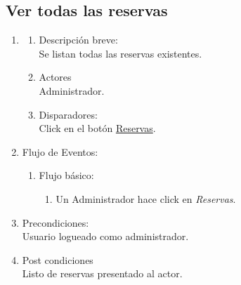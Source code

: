 \documentclass[a4paper,11pt]{article}
\begin{document}
\subsection{Ver todas las reservas}
\begin{enumerate}

    \item
    \begin{enumerate}
    \item Descripción breve: \\
        Se listan todas las reservas existentes.
    \item Actores \\
        Administrador.
    \item Disparadores: \\
        Click en el botón \underline{Reservas}.
    \end{enumerate}

    \item Flujo de Eventos: 

    \begin{enumerate}

        \item Flujo básico:
    		\begin{enumerate}
            	\item Un Administrador hace click en \emph{Reservas}.
		\end{enumerate}
    \end{enumerate}

    \item Precondiciones: \\
        Usuario logueado como administrador.

    \item Post condiciones \\
        Listo de reservas presentado al actor.

\end{enumerate}

\end{document}
